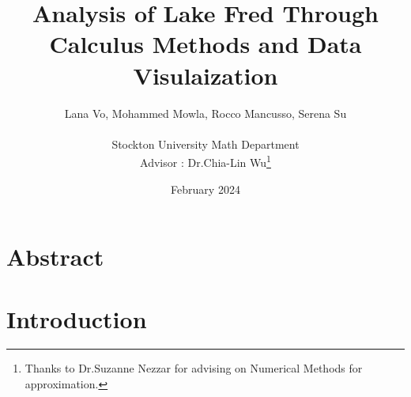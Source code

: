 \documentclass{article}
\title{\textbf{Analysis of Lake Fred Through Calculus Methods and Data Visulaization}}
\author{Lana Vo, Mohammed Mowla, Rocco Mancusso, Serena Su \\\\ Stockton University Math Department \\ Advisor : Dr.Chia-Lin Wu\thanks{Thanks to Dr.Suzanne Nezzar for advising on Numerical Methods for approximation.}}
\date{February 2024} %
\begin{document}
\maketitle
\newpage
\tableofcontents 
\newpage

\section{Abstract}

\newpage

\section{Introduction}
\end{document}
